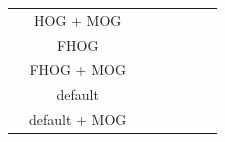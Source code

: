 \begin{table}[H]
\begin{tabular}{|c|c|c|c|c|c|c|c|}
                         & HOG + MOG  		&         &                   &     &     &     &          \\ \cline{2-8} 
                         & FHOG       		&         &                   &     &     &     &          \\ \cline{2-8}  
                         & FHOG + MOG 		&         &                   &     &     &     &          \\ \cline{2-8} 
                         & default 		&         &                   &     &     &     &          \\ \cline{2-8} 
                         & default + MOG 	&         &                   &     &     &     &          \\ \hline
\end{tabular}
\end{table}


